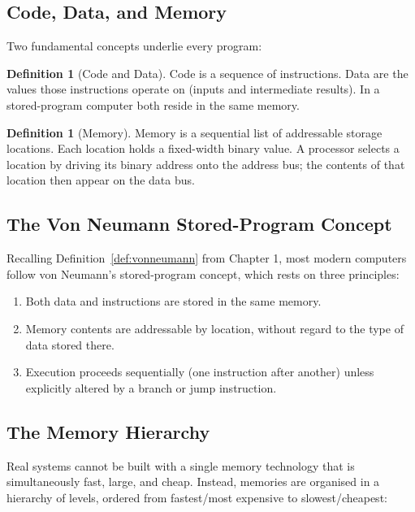 \documentclass[11pt, a4paper, notitlepage]{report}
\theoremstyle{definition}
\newtheorem{definition}[theorem]{Definition}
\theoremstyle{remark}
\theoremstyle{definition}
\begin{document}
\subsection{Code, Data, and Memory}

Two fundamental concepts underlie every program:

\begin{definition}[Code and Data]
\label{def:code-data}
Code is a sequence of instructions. Data are the values those instructions operate on (inputs and intermediate results). In a stored-program computer both reside in the same memory.
\end{definition}

\begin{definition}[Memory]
\label{def:memory}
Memory is a sequential list of addressable storage locations. Each location holds a fixed-width binary value. A processor selects a location by driving its binary address onto the address bus; the contents of that location then appear on the data bus.
\end{definition}

\subsection{The Von Neumann Stored-Program Concept}

Recalling Definition~\ref{def:vonneumann} from Chapter 1, most modern computers follow von Neumann's stored-program concept, which rests on three principles:

\begin{enumerate}
  \item Both data and instructions are stored in the same memory.
  \item Memory contents are addressable by location, without regard to the type of data stored there.
  \item Execution proceeds sequentially (one instruction after another) unless explicitly altered by a branch or jump instruction.
\end{enumerate}

\subsection{The Memory Hierarchy}

Real systems cannot be built with a single memory technology that is simultaneously fast, large, and cheap. Instead, memories are organised in a hierarchy of levels, ordered from fastest/most expensive to slowest/cheapest:
\end{document}
